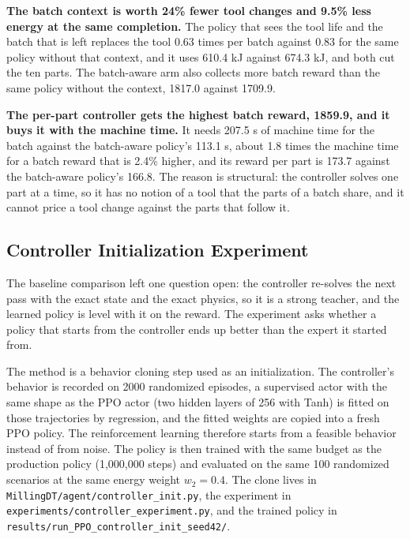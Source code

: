 \documentclass[11pt,a4paper]{article}
\begin{document}
\textbf{The batch context is worth 24\% fewer tool changes and 9.5\% less energy at the same completion.} The policy that sees the tool life and the batch that is left replaces the tool 0.63 times per batch against 0.83 for the same policy without that context, and it uses 610.4 kJ against 674.3 kJ, and both cut the ten parts. The batch-aware arm also collects more batch reward than the same policy without the context, 1817.0 against 1709.9.

\textbf{The per-part controller gets the highest batch reward, 1859.9, and it buys it with the machine time.} It needs 207.5 s of machine time for the batch against the batch-aware policy's 113.1 s, about 1.8 times the machine time for a batch reward that is 2.4\% higher, and its reward per part is 173.7 against the batch-aware policy's 166.8. The reason is structural: the controller solves one part at a time, so it has no notion of a tool that the parts of a batch share, and it cannot price a tool change against the parts that follow it.

\subsection{Controller Initialization Experiment}
\label{sec:controllerinit}

The baseline comparison left one question open: the controller re-solves the next pass with the exact state and the exact physics, so it is a strong teacher, and the learned policy is level with it on the reward. The experiment asks whether a policy that starts from the controller ends up better than the expert it started from.

The method is a behavior cloning step used as an initialization. The controller's behavior is recorded on 2000 randomized episodes, a supervised actor with the same shape as the PPO actor (two hidden layers of 256 with Tanh) is fitted on those trajectories by regression, and the fitted weights are copied into a fresh PPO policy. The reinforcement learning therefore starts from a feasible behavior instead of from noise. The policy is then trained with the same budget as the production policy (1,000,000 steps) and evaluated on the same 100 randomized scenarios at the same energy weight $w_2 = 0.4$. The clone lives in \texttt{MillingDT/\allowbreak agent/\allowbreak controller\_init.py}, the experiment in \texttt{experiments/\allowbreak controller\_experiment.py}, and the trained policy in \texttt{results/\allowbreak run\_PPO\_controller\_init\_seed42/}.
\end{document}
